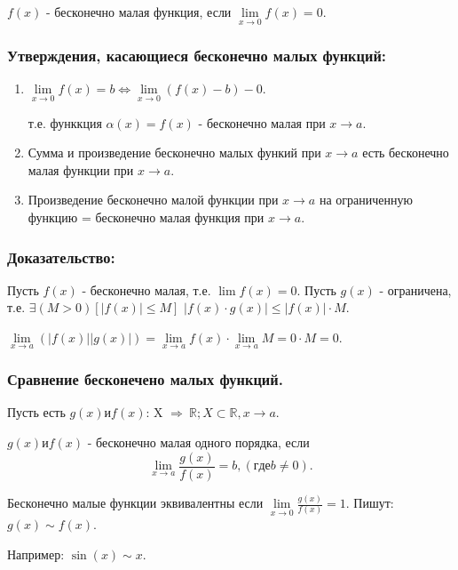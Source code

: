 \opred
	$f(x)$ - бесконечно малая функция, если $\lim\limits_{x\rightarrow0}f(x)=0$.

	\subsubsection {Утверждения, касающиеся бесконечно малых функций:}
	\begin{enumerate}
		\item $\lim\limits_{x\rightarrow0}f(x)=b \Leftrightarrow \lim\limits_{x\rightarrow0}(f(x)-b)-0$.

	     т.е. функкция $\alpha(x)=f(x)$ - бесконечно малая при $x \rightarrow a$.

		\item Сумма и произведение бесконечно малых функий при $x \rightarrow a$ есть бесконечно малая функции при $x \rightarrow a$.

		\item Произведение бесконечно малой функции при $x \rightarrow a$ на ограниченную функцию = бесконечно малая функция при $x \rightarrow a$.

		\end{enumerate}

	\subsubsection {Доказательство:}

	Пусть $f(x)$ - бесконечно малая, т.е. $\lim f(x)=0$. Пусть $g(x)$ - ограничена, т.е.
	$\exists(M>0)[|f(x)| \leq M]$ $|f(x)\cdot g(x)| \leq |f(x)|\cdot M$.

	$\lim\limits_{x\rightarrow a}(|f(x)||g(x)|)=\lim\limits_{x\rightarrow a}f(x) \cdot \lim\limits_{x\rightarrow a}M = 0 \cdot M = 0$.


	\subsubsection {Сравнение бесконечено малых функций.}

	Пусть есть $g(x) и f(x)$: X $\Rightarrow \ \mathbb {R}; X \subset  \mathbb {R}, x \rightarrow a$.

	$g(x) и f(x)$ - бесконечно малая одного порядка, если $$\lim\limits_{x\rightarrow a}\frac{g(x)}{f(x)}=b, (где b\neq 0).$$

	Бесконечно малые функции эквивалентны если $\lim\limits_{x \rightarrow 0}\frac{g(x)}{f(x)}=1$. Пишут: $g(x) \sim f(x)$.

	Например: $\sin(x) \sim x$.

